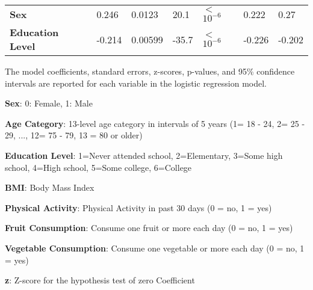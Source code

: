 \documentclass[11pt]{article}
\begin{document}
\begin{table}[h]
\begin{threeparttable}
{\begin{tabular}{lllllll}
\textbf{Sex} & \raisebox{2ex}{\hypertarget{A7a}{}}0.246 & \raisebox{2ex}{\hypertarget{A7b}{}}0.0123 & \raisebox{2ex}{\hypertarget{A7c}{}}20.1 & $<$\raisebox{2ex}{\hypertarget{A7d}{}}$10^{-6}$ & \raisebox{2ex}{\hypertarget{A7e}{}}0.222 & \raisebox{2ex}{\hypertarget{A7f}{}}0.27 \\
\textbf{Education Level} & \raisebox{2ex}{\hypertarget{A8a}{}}-0.214 & \raisebox{2ex}{\hypertarget{A8b}{}}0.00599 & \raisebox{2ex}{\hypertarget{A8c}{}}-35.7 & $<$\raisebox{2ex}{\hypertarget{A8d}{}}$10^{-6}$ & \raisebox{2ex}{\hypertarget{A8e}{}}-0.226 & \raisebox{2ex}{\hypertarget{A8f}{}}-0.202 \\
\bottomrule
\end{tabular}}
\begin{tablenotes}
\footnotesize
\item The model coefficients, standard errors, z-scores, p-values, and 95\% confidence intervals are reported for each variable in the logistic regression model.
\item \textbf{Sex}: 0: Female, 1: Male
\item \textbf{Age Category}: 13-level age category in intervals of 5 years (1= 18 - 24, 2= 25 - 29, ..., 12= 75 - 79, 13 = 80 or older)
\item \textbf{Education Level}: 1=Never attended school, 2=Elementary, 3=Some high school, 4=High school, 5=Some college, 6=College
\item \textbf{BMI}: Body Mass Index
\item \textbf{Physical Activity}: Physical Activity in past 30 days (0 = no, 1 = yes)
\item \textbf{Fruit Consumption}: Consume one fruit or more each day (0 = no, 1 = yes)
\item \textbf{Vegetable Consumption}: Consume one vegetable or more each day (0 = no, 1 = yes)
\item \textbf{z}: Z-score for the hypothesis test of zero Coefficient
\end{tablenotes}
\end{threeparttable}
\end{table}
\end{document}
